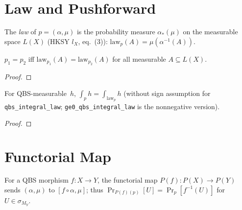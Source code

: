 \section{Law and Pushforward}\label{sec:pushforward}

\begin{definition}\label{def:qbs_law}
  \rocqok
  The \emph{law} of $p = (\alpha, \mu)$ is the probability measure
  $\alpha_*(\mu)$ on the measurable space $L(X)$ (HKSY $l_X$, eq.~(3)):
  $\mathrm{law}_p(A) = \mu(\alpha^{-1}(A))$.
\end{definition}

\begin{lemma}\label{lem:qbs_eq_lawP}
  \rocqok
  $p_1 = p_2$ iff $\mathrm{law}_{p_1}(A) = \mathrm{law}_{p_2}(A)$ for
  all measurable $A \subseteq L(X)$.
\end{lemma}
\begin{proof}\rocqok\end{proof}

\begin{lemma}\label{lem:qbs_integral_law}
  \rocqok
  For QBS-measurable~$h$, $\int_p h = \int_{\mathrm{law}_p} h$
  (without sign assumption for \texttt{qbs\_integral\_law};
  \texttt{ge0\_qbs\_integral\_law} is the nonnegative version).
\end{lemma}
\begin{proof}\rocqok\end{proof}


\section{Functorial Map}\label{sec:qbs_map}

\begin{definition}\label{def:qbs_map}
  \rocqok
  For a QBS morphism $f : X \to Y$, the functorial map
  $P(f) : P(X) \to P(Y)$ sends $(\alpha, \mu)$ to
  $[f \circ \alpha, \mu]$; thus $\Pr_{P(f)(p)}[U] = \Pr_p[f^{-1}(U)]$
  for $U \in \sigma_{M_Y}$.
\end{definition}


